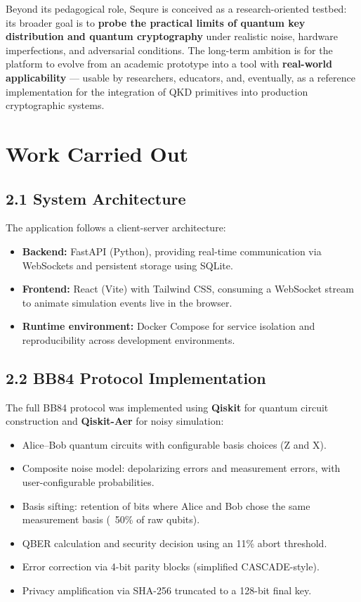 \documentclass[12pt, a4paper]{article}
\begin{document}
Beyond its pedagogical role, Sequre is conceived as a research-oriented
testbed: its broader goal is to \textbf{probe the practical limits of
quantum key distribution and quantum cryptography} under realistic noise,
hardware imperfections, and adversarial conditions. The long-term ambition
is for the platform to evolve from an academic prototype into a tool with
\textbf{real-world applicability} --- usable by researchers, educators, and,
eventually, as a reference implementation for the integration of QKD
primitives into production cryptographic systems.

\section{Work Carried Out}

\subsection{2.1 System Architecture}

The application follows a client-server architecture:

\begin{itemize}
  \item \textbf{Backend:} FastAPI (Python), providing real-time communication
        via WebSockets and persistent storage using SQLite.
  \item \textbf{Frontend:} React (Vite) with Tailwind CSS, consuming a
        WebSocket stream to animate simulation events live in the browser.
  \item \textbf{Runtime environment:} Docker Compose for service isolation
        and reproducibility across development environments.
\end{itemize}

\subsection{2.2 BB84 Protocol Implementation}

The full BB84 protocol was implemented using \textbf{Qiskit} for quantum
circuit construction and \textbf{Qiskit-Aer} for noisy simulation:

\begin{itemize}
  \item Alice--Bob quantum circuits with configurable basis choices (Z and X).
  \item Composite noise model: depolarizing errors and measurement errors,
        with user-configurable probabilities.
  \item Basis sifting: retention of bits where Alice and Bob chose the same
        measurement basis (~50\% of raw qubits).
  \item QBER calculation and security decision using an 11\% abort threshold.
  \item Error correction via 4-bit parity blocks (simplified CASCADE-style).
  \item Privacy amplification via SHA-256 truncated to a 128-bit final key.
\end{itemize}
\end{document}
